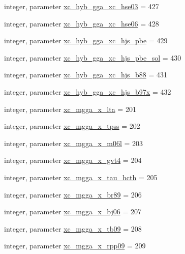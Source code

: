 \begin{DoxyCompactItemize}
integer, parameter \hyperlink{classlibxc__funcs__m_aa3f6e745d32a25be84381b38fdba923b}{xc\-\_\-hyb\-\_\-gga\-\_\-xc\-\_\-hse03} = 427
\item 
integer, parameter \hyperlink{classlibxc__funcs__m_a636a5942507068f64b70f819fd493c55}{xc\-\_\-hyb\-\_\-gga\-\_\-xc\-\_\-hse06} = 428
\item 
integer, parameter \hyperlink{classlibxc__funcs__m_acae1adf939cece166a5dc2fda06653d5}{xc\-\_\-hyb\-\_\-gga\-\_\-xc\-\_\-hjs\-\_\-pbe} = 429
\item 
integer, parameter \hyperlink{classlibxc__funcs__m_aaa971f348e960567a3fc0209757cd13a}{xc\-\_\-hyb\-\_\-gga\-\_\-xc\-\_\-hjs\-\_\-pbe\-\_\-sol} = 430
\item 
integer, parameter \hyperlink{classlibxc__funcs__m_ade3ca43f861d910e5251dc2de1707cf1}{xc\-\_\-hyb\-\_\-gga\-\_\-xc\-\_\-hjs\-\_\-b88} = 431
\item 
integer, parameter \hyperlink{classlibxc__funcs__m_a045fb7f10c7a67f838a373e06c90e29b}{xc\-\_\-hyb\-\_\-gga\-\_\-xc\-\_\-hjs\-\_\-b97x} = 432
\item 
integer, parameter \hyperlink{classlibxc__funcs__m_a85d415ad777487b51a126698b10dadc0}{xc\-\_\-mgga\-\_\-x\-\_\-lta} = 201
\item 
integer, parameter \hyperlink{classlibxc__funcs__m_a7334a3b44744cc6038e26ebbdbb0857f}{xc\-\_\-mgga\-\_\-x\-\_\-tpss} = 202
\item 
integer, parameter \hyperlink{classlibxc__funcs__m_a66f91e9dd26dc260eed7c6b1074b0f76}{xc\-\_\-mgga\-\_\-x\-\_\-m06l} = 203
\item 
integer, parameter \hyperlink{classlibxc__funcs__m_a1584fd172accdefa8bbc6fb7652aed56}{xc\-\_\-mgga\-\_\-x\-\_\-gvt4} = 204
\item 
integer, parameter \hyperlink{classlibxc__funcs__m_a57d9b8896da928d461e278dd0dce23af}{xc\-\_\-mgga\-\_\-x\-\_\-tau\-\_\-hcth} = 205
\item 
integer, parameter \hyperlink{classlibxc__funcs__m_a826f3ff7cb5f29d448e9d4093f2733db}{xc\-\_\-mgga\-\_\-x\-\_\-br89} = 206
\item 
integer, parameter \hyperlink{classlibxc__funcs__m_a6760ccba47e54232ab744869ed22e4d0}{xc\-\_\-mgga\-\_\-x\-\_\-bj06} = 207
\item 
integer, parameter \hyperlink{classlibxc__funcs__m_aee6cc04ce4ca7723227366d4988bf0aa}{xc\-\_\-mgga\-\_\-x\-\_\-tb09} = 208
\item 
integer, parameter \hyperlink{classlibxc__funcs__m_a46551ee73eda72d90e1f8933ecca9f1b}{xc\-\_\-mgga\-\_\-x\-\_\-rpp09} = 209

\end{DoxyCompactItemize}
